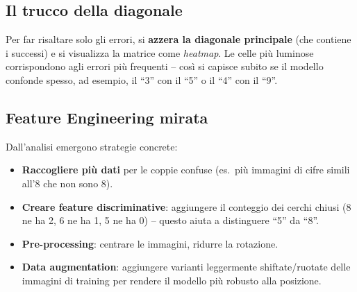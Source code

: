 \subsection{Il trucco della diagonale}

Per far risaltare solo gli errori, si \textbf{azzera la diagonale principale} (che contiene i successi) e si visualizza la matrice come \emph{heatmap}. Le celle più luminose corrispondono agli errori più frequenti -- così si capisce subito se il modello confonde spesso, ad esempio, il ``3'' con il ``5'' o il ``4'' con il ``9''.

\begin{center}
\end{center}

\subsection{Feature Engineering mirata}

Dall'analisi emergono strategie concrete:
\begin{itemize}
    \item \textbf{Raccogliere più dati} per le coppie confuse (es.\ più immagini di cifre simili all'8 che non sono 8).
    \item \textbf{Creare feature discriminative}: aggiungere il conteggio dei cerchi chiusi (8 ne ha 2, 6 ne ha 1, 5 ne ha 0) -- questo aiuta a distinguere ``5'' da ``8''.
    \item \textbf{Pre-processing}: centrare le immagini, ridurre la rotazione.
    \item \textbf{Data augmentation}: aggiungere varianti leggermente shiftate/ruotate delle immagini di training per rendere il modello più robusto alla posizione.
\end{itemize}


